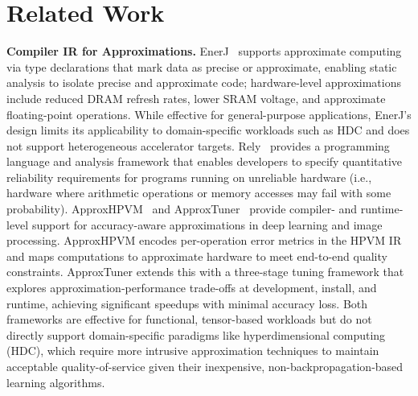 \section{Related Work}


\textbf{Compiler IR for Approximations.}
EnerJ~\cite{enerJ} supports approximate computing via type declarations that mark data as precise or approximate, enabling static analysis to isolate precise and approximate code; hardware-level approximations include reduced DRAM refresh rates, lower SRAM voltage, and approximate floating-point operations. While effective for general-purpose applications, EnerJ’s design limits its applicability to domain-specific workloads such as HDC and does not support heterogeneous accelerator targets. Rely~\cite{rely} provides a programming language and analysis framework that enables developers to specify quantitative reliability requirements for programs running on unreliable hardware (i.e., hardware where arithmetic operations or memory accesses may fail with some probability). ApproxHPVM~\cite{approxhpvm} and ApproxTuner~\cite{approxtuner} provide compiler- and runtime-level support for accuracy-aware approximations in deep learning and image processing. ApproxHPVM encodes per-operation error metrics in the HPVM IR and maps computations to approximate hardware to meet end-to-end quality constraints. %
ApproxTuner extends this with a three-stage tuning framework that explores approximation-performance trade-offs at development, install, and runtime, achieving significant speedups with minimal accuracy loss. Both frameworks are effective for functional, tensor-based workloads but do not directly support domain-specific paradigms like hyperdimensional computing (HDC), which require more intrusive approximation techniques to maintain acceptable quality-of-service given their inexpensive, non-backpropagation-based learning algorithms. %



